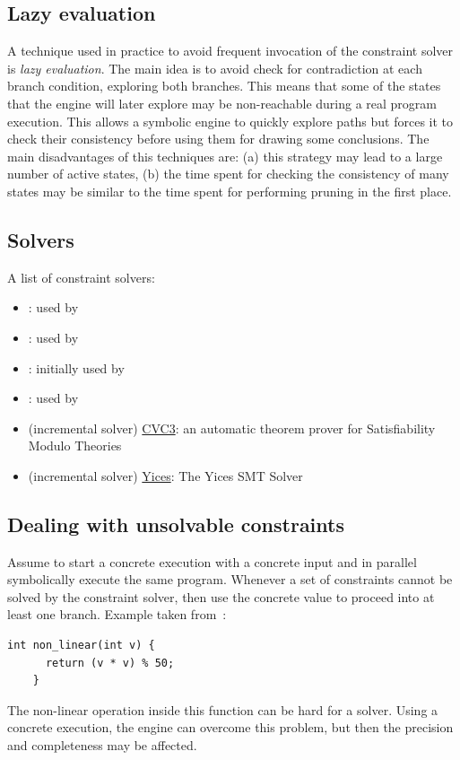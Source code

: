 \subsection{Lazy evaluation}
A technique used in practice to avoid frequent invocation of the constraint solver is {\em lazy evaluation}. The main idea is to avoid check for contradiction at each branch condition, exploring both branches. This means that some of the states that the engine will later explore may be non-reachable during a real program execution. This allows a symbolic engine to quickly explore paths but forces it to check their consistency before using them for drawing some conclusions. The main disadvantages of this techniques are: (a) this strategy may lead to a large number of active states, (b) the time spent for checking the consistency of many states may be similar to the time spent for performing pruning in the first place.

\subsection{Solvers}
A list of constraint solvers:
\begin{itemize}
  \item \cite{STP-TR07}: used by~\cite{EXE-CCS06,KLEE-OSDI08,MineSweeper-BOTNET08}
  \item \cite{Z3-TACS08}: used by~\cite{FIRMALICE-NDSS15,MAYHEM-SP12}
  \item \cite{DISSOLVER-TR03}: initially used by \cite{SAGE-NDSS08}
  \item \cite{PPL-SCP08}: used by \cite{AEG-NDSS11}
  \item (incremental solver) \href{http://www.cs.nyu.edu/acsys/cvc3/}{CVC3}: an automatic theorem prover for Satisfiability Modulo Theories
  \item (incremental solver) \href{http://yices.csl.sri.com/}{Yices}: The Yices SMT Solver
\end{itemize}

\subsection{Dealing with unsolvable constraints} 

Assume to start a concrete execution with a concrete input and in parallel symbolically execute the same program. Whenever a set of constraints cannot be solved by the constraint solver, then use the concrete value to proceed into at least one branch. Example taken from~\cite{CS-CACM13}:
    \begin{lstlisting}[basicstyle=\ttfamily\small]
    int non_linear(int v) {
      return (v * v) % 50;
    }
    \end{lstlisting}
The non-linear operation inside this function can be hard for a solver. Using a concrete execution, the engine can overcome this problem, but then the precision and completeness may be affected.

